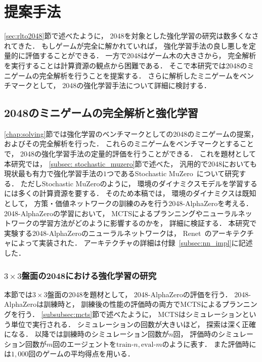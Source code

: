 \chapter{提案手法}
\label{chap:proposal}
\ref{sec:rlto2048}節で述べたように， 2048を対象とした強化学習の研究は数多くなされてきた．
もしゲームが完全に解かれていれば， 強化学習手法の良し悪しを定量的に評価することができる．
一方で2048はゲーム木の大きさから， 完全解析を実行することは計算資源の観点から困難である．
そこで本研究では2048のミニゲームの完全解析を行うことを提案する．
さらに解析したミニゲームをベンチマークとして， 2048の強化学習手法について詳細に検討する．



\section{2048のミニゲームの完全解析と強化学習}
\ref{chap:solving}節では強化学習のベンチマークとしての2048のミニゲームの提案， およびその完全解析を行った．
これらのミニゲームをベンチマークとすることで， 2048の強化学習手法の定量的評価を行うことができる．
これを題材として本研究では， \ref{subsec: stochastic_muzero}節で述べた， 汎用的で2048においても現状最も有力で強化学習手法の$1$つであるStochastic MuZero~\cite{StochasticMuZero}について研究する．
ただしStochastic MuZeroのように， 環境のダイナミクスモデルを学習するには多くの計算資源を要する．
そのため本稿では， 環境のダイナミクスは既知として， 方策・価値ネットワークの訓練のみを行う2048-AlphaZeroを考える．
2048-AlphaZeroの学習において， MCTSによるプランニングやニューラルネットワークの学習方法がどのように影響するのかを， 詳細に検証する．
本研究で実験する2048-AlphaZeroのニューラルネットワークは， Renet~\cite{Resnet}のアーキテクチャによって実装された．
アーキテクチャの詳細は付録~\ref{subsec:nn_impl}に記述した．

\subsection{$3\times3$盤面の2048における強化学習の研究}
本節では$3\times3$盤面の2048を題材として， 2048-AlphaZeroの評価を行う．
2048-AlphaZeroは訓練時と， 訓練後の性能の評価時の両方でMCTSによるプランニングを行う．
\ref{subsubsec:mcts}節で述べたように， MCTSはシミュレーションという単位で実行される．
シミュレーションの回数が大きいほど， 探索は深く正確になる．
以降では訓練時のシミュレーション回数が$n$回， 評価時のシミュレーション回数が$m$回のエージェントを$\text{train-}n,\text{eval-}m$のように表す．
また評価時には$1,000$回のゲームの平均得点を用いる．

